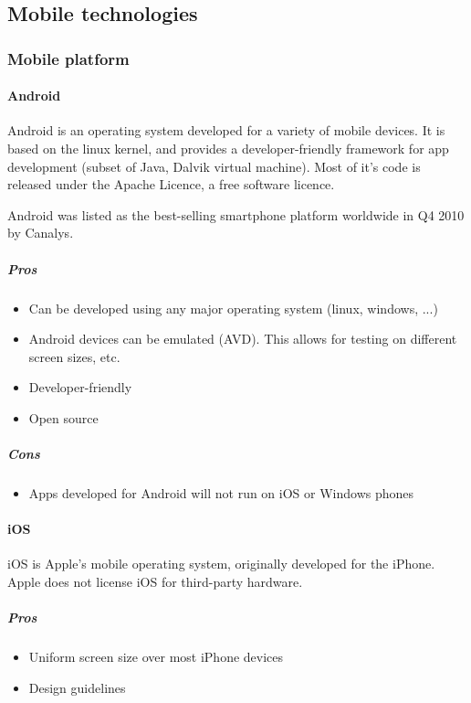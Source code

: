\subsection{Mobile technologies}

\subsubsection{Mobile platform}

\paragraph{Android}

	Android is an operating system developed for a variety of mobile devices.
	It is based on the linux kernel, and provides a developer-friendly
	framework for app development (subset of Java, Dalvik virtual machine).
	Most of it's code is released under the Apache Licence, a free software
	licence.

	Android was listed as the best-selling smartphone platform worldwide in Q4
	2010 by Canalys. \cite{wiki:android}

	\subparagraph{Pros}
		\begin{itemize}
			\item Can be developed using any major operating system (linux, windows, ...)
			\item Android devices can be emulated (AVD). This allows for testing on
			different screen sizes, etc.
			\item Developer-friendly
			\item Open source
		\end{itemize}

	\subparagraph{Cons}
		\begin{itemize}
			\item Apps developed for Android will not run on iOS or Windows phones
		\end{itemize}

\paragraph{iOS}

	iOS is Apple's mobile operating system, originally developed for the
	iPhone. Apple does not license iOS for third-party hardware.

	\subparagraph{Pros}
	\begin{itemize}
		\item Uniform screen size over most iPhone devices
		\item Design guidelines
	\end{itemize}


